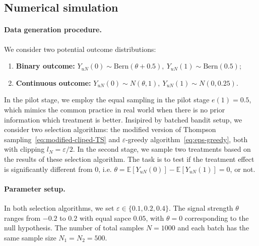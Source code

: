 \documentclass[12pt]{article}
\newcommand{\E}{\mathbb E}								%
\begin{document}
\subsection{Numerical simulation}\label{sec:simulation}

\paragraph{Data generation procedure.} We consider two potential outcome distributions: 
\begin{enumerate}
	\item \textbf{Binary outcome:} $Y_{uN}(0)\sim \mathrm{Bern}(\theta+0.5),\ Y_{uN}(1)\sim \mathrm{Bern}(0.5)$;
	\item \textbf{Continuous outcome:} $Y_{uN}(0)\sim N(\theta,1),\ Y_{uN}(1)\sim N(0,0.25)$.
\end{enumerate}
In the pilot stage, we employ the equal sampling in the pilot stage $e(1)=0.5$, which mimics the common practice in real world when there is no prior information which treatment is better. Insipired by batched bandit setup, we consider two selection algorithms: the modified version of Thompson sampling~\eqref{eq:modified-cliped-TS} and $\varepsilon$-greedy algorithm~\eqref{eq:eps-greedy}, both with clipping $l_N=\varepsilon/2$. In the second stage, we sample two treatments based on the results of these selection algorithm. The task is to test if the treatment effect is significantly different from $0$, i.e. $\theta=\E[Y_{uN}(0)]-\E[Y_{uN}(1)]=0$, or not.

\paragraph{Parameter setup.} In both selection algorithms, we set $\varepsilon \in\{ 0.1, 0.2, 0.4\}$. The signal strength $\theta$ ranges from $-0.2$ to $0.2$ with equal sapce $0.05$, with $\theta=0$ corresponding to the null hypothesis. The number of total samples $N=1000$ and each batch has the same sample size $N_1=N_2=500$. 
\end{document}
